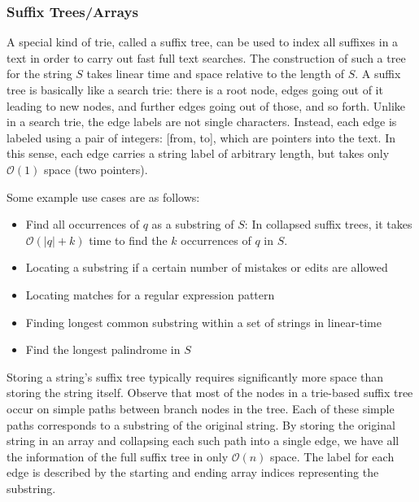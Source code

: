 \documentclass{article}
\newcommand{\bigO}{\mathcal{O}}
\begin{document}
    \subsubsection{Suffix Trees/Arrays}
    A special kind of trie, called a suffix tree, can be used to index all suffixes in a text in order to carry out fast full text searches. The construction of such a tree for the string $S$ takes linear time and space relative to the length of $S$. A suffix tree is basically like a search trie: there is a root node, edges going out of it leading to new nodes, and further edges going out of those, and so forth. Unlike in a search trie, the edge labels are not single characters. Instead, each edge is labeled using a pair of integers: [from, to], which are pointers into the text. In this sense, each edge carries a string label of arbitrary length, but takes only $\bigO(1)$ space (two pointers).
    
    Some example use cases are as follows:
    \begin{itemize}
        \item Find all occurrences of $q$ as a substring of $S$: In collapsed suffix trees, it takes $\bigO(|q| + k)$ time to find the $k$ occurrences of $q$ in $S$.
        \item Locating a substring if a certain number of mistakes or edits are allowed
        \item Locating matches for a regular expression pattern
        \item Finding longest common substring within a set of strings in linear-time
        \item Find the longest palindrome in $S$
    \end{itemize}
    
    Storing a string's suffix tree typically requires significantly more space than storing the string itself. Observe that most of the nodes in a trie-based suffix tree occur on simple paths between branch nodes in the tree. Each of these simple paths corresponds to a substring of the original string. By storing the original string in an array and collapsing each such path into a single edge, we have all the information of the full suffix tree in only $\bigO(n)$ space. The label for each edge is described by the starting and ending array indices representing the substring. 
    
\end{document}
